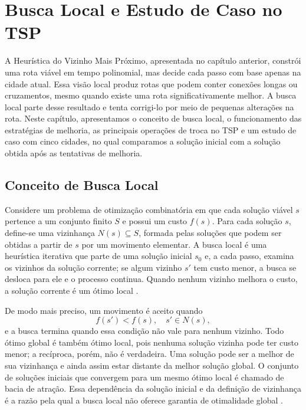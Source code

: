 
\chapter[Busca Local e Estudo de Caso no TSP]{Busca Local e Estudo de Caso no TSP}

A Heurística do Vizinho Mais Próximo, apresentada no capítulo anterior, constrói uma rota viável em tempo polinomial, mas decide cada passo com base apenas na cidade atual. Essa visão local produz rotas que podem conter conexões longas ou cruzamentos, mesmo quando existe uma rota significativamente melhor. A busca local parte desse resultado e tenta corrigi-lo por meio de pequenas alterações na rota. Neste capítulo, apresentamos o conceito de busca local, o funcionamento das estratégias de melhoria, as principais operações de troca no TSP e um estudo de caso com cinco cidades, no qual comparamos a solução inicial com a solução obtida após as tentativas de melhoria.

\section{Conceito de Busca Local}

Considere um problema de otimização combinatória em que cada solução viável $s$ pertence a um conjunto finito $S$ e possui um custo $f(s)$. Para cada solução $s$, define-se uma vizinhança $N(s) \subseteq S$, formada pelas soluções que podem ser obtidas a partir de $s$ por um movimento elementar. A busca local é uma heurística iterativa que parte de uma solução inicial $s_0$ e, a cada passo, examina os vizinhos da solução corrente; se algum vizinho $s'$ tem custo menor, a busca se desloca para ele e o processo continua. Quando nenhum vizinho melhora o custo, a solução corrente é um ótimo local \cite{aarts2003, goldbarg2005}.

De modo mais preciso, um movimento é aceito quando
\begin{equation}
    f(s') < f(s), \quad s' \in N(s),
    \label{eq:aceitacao-busca-local}
\end{equation}
e a busca termina quando essa condição não vale para nenhum vizinho. Todo ótimo global é também ótimo local, pois nenhuma solução vizinha pode ter custo menor; a recíproca, porém, não é verdadeira. Uma solução pode ser a melhor de sua vizinhança e ainda assim estar distante da melhor solução global. O conjunto de soluções iniciais que convergem para um mesmo ótimo local é chamado de bacia de atração. Essa dependência da solução inicial e da definição de vizinhança é a razão pela qual a busca local não oferece garantia de otimalidade global \cite{russell2013}.

